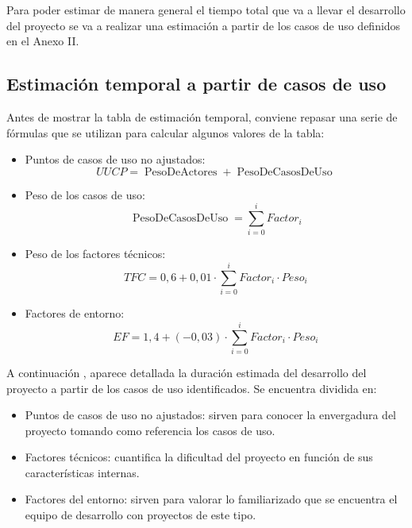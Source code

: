 Para poder estimar de manera general el tiempo total que va a llevar el desarrollo del proyecto se va a realizar una estimación a partir de los casos de uso definidos en el Anexo II.

\newcommand{\pesoscasosdeuso}{\operatorname{Peso De Casos De Uso}}
\newcommand{\pesosactores}{\operatorname{Peso De Actores}}

\subsection{Estimación temporal a partir de casos de uso}
Antes de mostrar la tabla de estimación temporal, conviene repasar una serie de fórmulas que se utilizan para calcular algunos valores de la tabla:
\begin{itemize}
 \item Puntos de casos de uso no ajustados:
  \[ UUCP = \pesosactores + \pesoscasosdeuso \]
 \item Peso de los casos de uso:
  \[ \pesoscasosdeuso = \sum_{i = 0}^{i} Factor_{i} \]
 \item Peso de los factores técnicos:
  \[ TFC = 0,6 + 0,01 \cdot \sum_{i = 0}^{i} Factor_{i} \cdot Peso_{i} \]
 \item Factores de entorno:
  \[ EF = 1,4 + (-0,03) \cdot \sum_{i = 0}^{i} Factor_{i} \cdot Peso_{i} \]
\end{itemize}

A continuación , aparece detallada la duración estimada del desarrollo del proyecto a partir de los casos de uso identificados. Se encuentra dividida en:
\begin{itemize}
 \item Puntos de casos de uso no ajustados: sirven para conocer la envergadura del proyecto tomando como referencia los casos de uso.
 \item Factores técnicos: cuantifica la dificultad del proyecto en función de sus características internas.
 \item Factores del entorno: sirven para valorar lo familiarizado que se encuentra el equipo de desarrollo con proyectos de este tipo.
\end{itemize}

